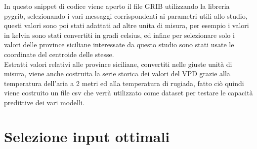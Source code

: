 In questo snippet di codice viene aperto il file GRIB utilizzando la libreria pygrib, selezionando i vari messaggi corrispondenti ai parametri utili allo studio, questi valori sono poi stati adattati ad altre unita di misura, per esempio i valori in kelvin sono stati convertiti in gradi celsius, ed infine per selezionare solo i valori delle province siciliane interessate da questo studio sono stati usate le coordinate del centroide delle stesse.\\
Estratti valori relativi alle province siciliane, convertiti nelle giuste unità di misura, viene anche costruita la serie storica dei valori del VPD grazie alla temperatura dell'aria a 2 metri ed alla temperatura di rugiada, fatto ciò quindi viene costruito un file csv che verrà utilizzato come dataset per testare le capacità predittive dei vari modelli.

\section{Selezione input ottimali}
